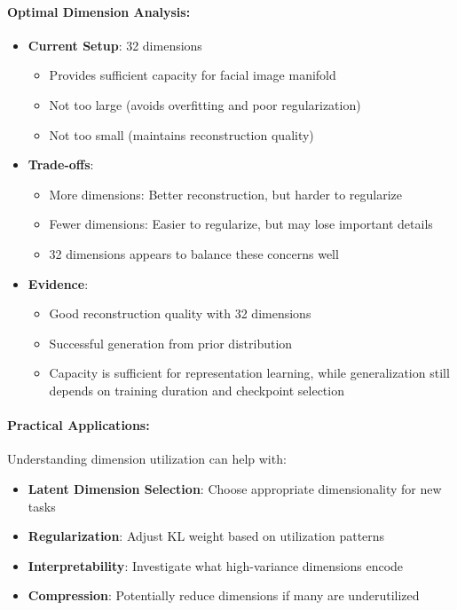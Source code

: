 \documentclass[conference]{IEEEtran}
\begin{document}
\paragraph{Optimal Dimension Analysis:}
\begin{itemize}
    \item \textbf{Current Setup}: 32 dimensions
    \begin{itemize}
        \item Provides sufficient capacity for facial image manifold
        \item Not too large (avoids overfitting and poor regularization)
        \item Not too small (maintains reconstruction quality)
    \end{itemize}
    
    \item \textbf{Trade-offs}:
    \begin{itemize}
        \item More dimensions: Better reconstruction, but harder to regularize
        \item Fewer dimensions: Easier to regularize, but may lose important details
        \item 32 dimensions appears to balance these concerns well
    \end{itemize}
    
    \item \textbf{Evidence}:
    \begin{itemize}
        \item Good reconstruction quality with 32 dimensions
        \item Successful generation from prior distribution
        \item Capacity is sufficient for representation learning, while generalization still depends on training duration and checkpoint selection
    \end{itemize}
\end{itemize}

\paragraph{Practical Applications:}
Understanding dimension utilization can help with:
\begin{itemize}
    \item \textbf{Latent Dimension Selection}: Choose appropriate dimensionality for new tasks
    \item \textbf{Regularization}: Adjust KL weight based on utilization patterns
    \item \textbf{Interpretability}: Investigate what high-variance dimensions encode
    \item \textbf{Compression}: Potentially reduce dimensions if many are underutilized
\end{itemize}
\end{document}
